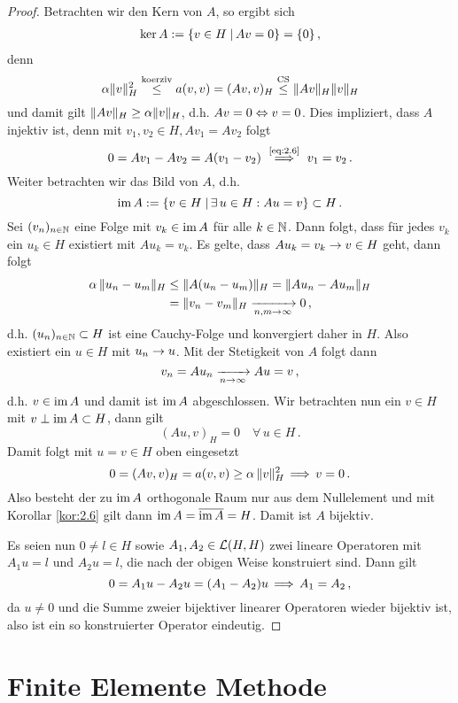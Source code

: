 \begin{itemize}
\begin{proof}
Betrachten wir den Kern von $A$, so ergibt sich
\begin{align}\label{eq:2.6}
	\ker A := \{ v \in H \;\vert\, Av = 0\} = \{0\} \, ,
\end{align}
denn
\[
	\alpha \lVert v\rVert_H^2 \stackrel{\scriptsize \text{koerziv}}\le a(v,v)  = (Av,v)_H \stackrel{\scriptsize \text{CS}}\le \lVert Av\rVert_H \lVert v\rVert_H 
\]
und damit gilt $\lVert Av\rVert_H \ge \alpha \lVert v\rVert_H$, d.h. $Av = 0 \Leftrightarrow v = 0$. Dies impliziert, dass $A$ injektiv ist, denn mit $v_1,v_2\in H, Av_1 = Av_2$ folgt
\[
	0 = Av_1 - Av_2 = A(v_1-v_2) \ \stackrel{\scriptsize\eqref{eq:2.6}}\lra \ v_1 = v_2 \, .
\]
Weiter betrachten wir das Bild von $A$, d.h.
\[
	\operatorname{im} A := \{ v \in H \;\vert\, \exists \, u \in H : Au = v \} \subset H\, .
\]
Sei $(v_n)_{n \in \mathbb{N}}$ eine Folge mit $v_k \in \operatorname{im} A $ für alle $k \in \mathbb{N}$. Dann folgt, dass für jedes $v_k$ ein $u_k \in H$ existiert mit $A u_k = v_k$. Es gelte, dass $Au_k = v_k \rightarrow v \in H$ geht, dann folgt
\begin{align*}
	\alpha \, \lVert u_n -u_m\rVert_H & \le \lVert A(u_n-u_m)\rVert_H = \lVert Au_n-Au_m\rVert_H \\
	& = \lVert v_n-v_m\rVert_H \xrightarrow[n,m\rightarrow \infty]{} 0 \, ,
\end{align*}
d.h. $(u_n)_{n\in \mathbb{N}} \subset H$ ist eine Cauchy-Folge und konvergiert daher in $H$. Also existiert ein $u \in H$ mit $u_n \rightarrow u$. Mit der Stetigkeit von $A$ folgt dann
\[
	v_n = A u_n \xrightarrow[n\rightarrow \infty]{} Au = v\, ,
\]
d.h. $v \in \operatorname{im} A$ und damit ist $\operatorname{im} A$ abgeschlossen. Wir betrachten nun ein $v \in H$ mit $v \perp \operatorname{im} A \subset H$, dann gilt
\[
	(Au,v)_H = 0 \quad \forall \, u \in H \, .
\]
Damit folgt mit $u = v \in H$ oben eingesetzt
\[
	 0 = (Av,v)_H = a(v,v) \ge \alpha \, \lVert v\rVert_H^2 \, \Longrightarrow \, v = 0 \, .
\]
Also besteht der zu $\operatorname{im} A$ orthogonale Raum nur aus dem Nullelement und mit Korollar \ref{kor:2.6} gilt dann $\operatorname{im} A = \overline{\operatorname{im} A} = H$. Damit ist $A$ bijektiv.

Es seien nun $0 \not = l\in H$ sowie $A_1,A_2 \in \mathcal L(H,H)$ zwei lineare Operatoren mit $A_1u = l$ und $A_2 u = l$, die nach der obigen Weise konstruiert sind. Dann gilt
\[
	0 = A_1 u - A_2 u = (A_1 - A_2)u \, \Longrightarrow \, A_1 = A_2 \, , 
\]
da $u \not = 0$ und die Summe zweier bijektiver linearer Operatoren wieder bijektiv ist, also ist ein so konstruierter Operator eindeutig.
\end{proof}
\end{itemize}






\section{Finite Elemente Methode}

